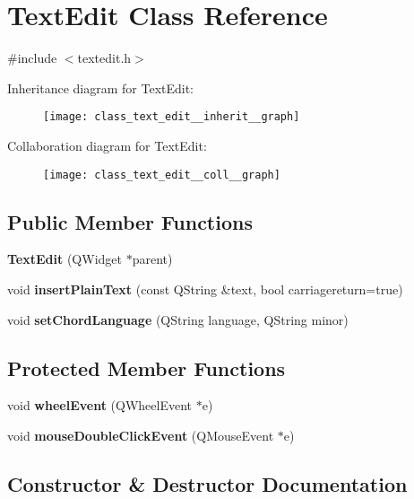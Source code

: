 \section{Text\+Edit Class Reference}
\label{class_text_edit}


{\ttfamily \#include $<$textedit.\+h$>$}



Inheritance diagram for Text\+Edit\+:\nopagebreak
\begin{figure}[H]
\begin{center}
\leavevmode
\texttt{[image: class\_text\_edit\_\_inherit\_\_graph]}
\end{center}
\end{figure}


Collaboration diagram for Text\+Edit\+:\nopagebreak
\begin{figure}[H]
\begin{center}
\leavevmode
\texttt{[image: class\_text\_edit\_\_coll\_\_graph]}
\end{center}
\end{figure}
\subsection*{Public Member Functions}
\begin{DoxyCompactItemize}
\item 
\textbf{ Text\+Edit} (Q\+Widget $\ast$parent)
\item 
void \textbf{ insert\+Plain\+Text} (const Q\+String \&text, bool carriagereturn=true)
\item 
void \textbf{ set\+Chord\+Language} (Q\+String language, Q\+String minor)
\end{DoxyCompactItemize}
\subsection*{Protected Member Functions}
\begin{DoxyCompactItemize}
\item 
void \textbf{ wheel\+Event} (Q\+Wheel\+Event $\ast$e)
\item 
void \textbf{ mouse\+Double\+Click\+Event} (Q\+Mouse\+Event $\ast$e)
\end{DoxyCompactItemize}


\subsection{Constructor \& Destructor Documentation}
\mbox{\label{class_text_edit_a4c5999373348fba9f3771ebfe7dbe9d0}} 
